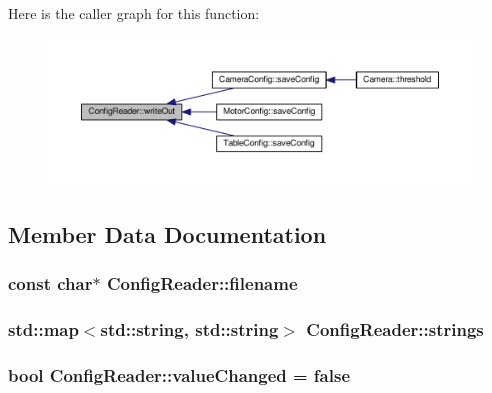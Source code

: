 Here is the caller graph for this function\+:\nopagebreak
\begin{figure}[H]
\begin{center}
\leavevmode
\includegraphics[width=350pt]{class_config_reader_a40c8fc72bb2a097398c821cfec78ba6e_icgraph}
\end{center}
\end{figure}




\subsection{Member Data Documentation}
\subsubsection[{\texorpdfstring{filename}{filename}}]{\setlength{\rightskip}{0pt plus 5cm}const char$\ast$ Config\+Reader\+::filename\hspace{0.3cm}{\ttfamily [protected]}}\hypertarget{class_config_reader_a82435410daeab9beb0dc90500976acfc}{}\label{class_config_reader_a82435410daeab9beb0dc90500976acfc}
\subsubsection[{\texorpdfstring{strings}{strings}}]{\setlength{\rightskip}{0pt plus 5cm}std\+::map$<$std\+::string, std\+::string$>$ Config\+Reader\+::strings\hspace{0.3cm}{\ttfamily [protected]}}\hypertarget{class_config_reader_ac03a3baf208f4dd2c2e5a8c9494b431b}{}\label{class_config_reader_ac03a3baf208f4dd2c2e5a8c9494b431b}
\subsubsection[{\texorpdfstring{value\+Changed}{valueChanged}}]{\setlength{\rightskip}{0pt plus 5cm}bool Config\+Reader\+::value\+Changed = false\hspace{0.3cm}{\ttfamily [protected]}}\hypertarget{class_config_reader_aa384495927b6c1677d39e34eac3e577c}{}\label{class_config_reader_aa384495927b6c1677d39e34eac3e577c}
